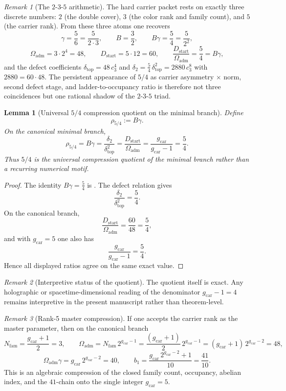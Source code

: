 \documentclass[11pt,a4paper]{article}
\newtheorem{lemma}[theorem]{Lemma}
\theoremstyle{definition}
\theoremstyle{remark}
\newtheorem*{remark}{Remark}
\newcommand{\cthree}{c_3}
\newcommand{\deltatop}{\delta_{\mathrm{top}}}
\newcommand{\bone}{b_1}
\newcommand{\Oadm}{\Omega_{\mathrm{adm}}}
\newcommand{\gcar}{g_{\mathrm{car}}}
\newcommand{\Dstart}{D_{\mathrm{start}}}
\begin{document}
\begin{remark}[The $2$-$3$-$5$ arithmetic]
The hard carrier packet rests on exactly three discrete numbers: $2$ (the double cover), $3$ (the color rank and family count), and $5$ (the carrier rank). From these three atoms one recovers
\[
\gamma=\frac{5}{6}=\frac{5}{2\cdot 3},
\qquad
B=\frac{3}{2},
\qquad
B\gamma=\frac{5}{4}=\frac{5}{2^2},
\]
\[
\Oadm=3\cdot 2^4=48,
\qquad
\Dstart=5\cdot 12=60,
\qquad
\frac{\Dstart}{\Oadm}=\frac{5}{4}=B\gamma,
\]
and the defect coefficients $\deltatop=48\,\cthree^4$ and $\delta_2=\frac54\,\deltatop^2=2880\,\cthree^8$ with $2880=60\cdot 48$.
The persistent appearance of $5/4$ as carrier asymmetry $\times$ norm, second defect stage, and ladder-to-occupancy ratio is therefore not three coincidences but one rational shadow of the $2$-$3$-$5$ triad.
\end{remark}

\begin{lemma}[Universal \texorpdfstring{$5/4$}{5/4} compression quotient on the minimal branch]
\label{lem:universal-5-4-compression}
Define
\[
\rho_{5/4}:=B\gamma.
\]
On the canonical minimal branch,
\[
\rho_{5/4}
=
B\gamma
=
\frac{\delta_2}{\deltatop^2}
=
\frac{\Dstart}{\Oadm}
=
\frac{\gcar}{\gcar-1}
=
\frac54.
\]
Thus $5/4$ is the universal compression quotient of the minimal branch rather than a recurring numerical motif.
\end{lemma}

\begin{proof}
The identity $B\gamma=\frac54$ is . The defect relation gives
\[
\frac{\delta_2}{\deltatop^2}=\frac54.
\]
On the canonical branch,
\[
\frac{\Dstart}{\Oadm}=\frac{60}{48}=\frac54,
\]
and with $\gcar=5$ one also has
\[
\frac{\gcar}{\gcar-1}=\frac{5}{4}.
\]
Hence all displayed ratios agree on the same exact value.
\end{proof}

\begin{remark}[Interpretive status of the quotient]
The quotient itself is exact. Any holographic or spacetime-dimensional reading of the denominator $\gcar-1=4$ remains interpretive in the present manuscript rather than theorem-level.
\end{remark}

\begin{remark}[Rank-5 master compression]
If one accepts the carrier rank as the master parameter, then on the canonical branch
\[
N_{\mathrm{fam}}=\frac{\gcar+1}{2}=3,
\qquad
\Oadm=N_{\mathrm{fam}}\,2^{\gcar-1}=\frac{(\gcar+1)}{2}\,2^{\gcar-1}=(\gcar+1)\,2^{\gcar-2}=48,
\]
\[
\Oadm\gamma=\gcar\,2^{\gcar-2}=40,
\qquad
\bone=\frac{\gcar\,2^{\gcar-2}+1}{10}=\frac{41}{10}.
\]
This is an algebraic compression of the closed family count, occupancy, abelian index, and the
$41$-chain onto the single integer $\gcar=5$.
\end{remark}
\end{document}
